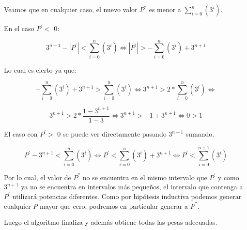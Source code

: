 Veamos que en cualquier caso, el nuevo valor $P^{''}$ es menor a $\sum_{i=0}^{n}(3^i)$.

En el caso $P^{'} <$ 0:

\begin{equation}
3^{n+1} - |P^{'}| < \sum_{i=0}^{n}(3^i) \iff
|P^{'}| > - \sum_{i=0}^{n}(3^i) + 3^{n+1}
\end{equation}

Lo cual es cierto ya que:

\begin{equation}
- \sum_{i=0}^{n}(3^i) + 3^{n+1} >  \sum_{i=0}^{n}(3^i) \iff
3^{n+1} > 2 \ast \sum_{i=0}^{n}(3^i) \iff
\end{equation}

\begin{equation}
3^{n+1} > 2 \ast \frac{1-3^{n+1}}{1-3} \iff
3^{n+1} > -1+3^{n+1} \iff
0 > 1
\end{equation}

El caso con $P^{'} >$ 0 se puede ver directamente pasando $3^{n+1}$ sumando.

\begin{equation}
P^{'} - 3^{n+1} < \sum_{i=0}^{n}(3^i) \iff
P^{'} < \sum_{i=0}^{n}(3^i) + 3^{n+1} \iff
P^{'} < \sum_{i=0}^{n+1}(3^i)
\end{equation}

Por lo cual, el valor de $P^{''}$ no se encuentra en el mismo intervalo que $P^{'}$ y como $3^{n+1}$ ya no se encuentra en intervalos más pequeños, el intervalo que contenga a $P^{'}$ utilizará potencias diferentes. Como por hipótesis inductiva podemos generar cualquier $P$ mayor que cero, podremos en particular generar a $P^{''}$.

Luego el algoritmo finaliza y además obtiene todas las pesas adecuadas.\\
